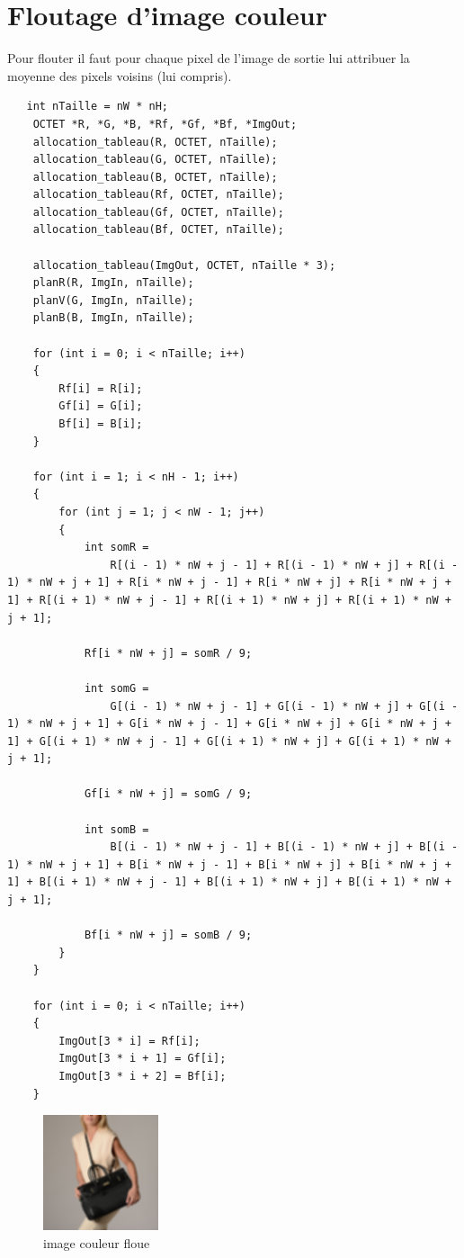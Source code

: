 \documentclass{article}
\begin{document}
\section{Floutage d'image couleur}
Pour flouter il faut pour chaque pixel de l'image de sortie lui attribuer la moyenne des pixels voisins (lui compris).
\begin{lstlisting}
   int nTaille = nW * nH;
    OCTET *R, *G, *B, *Rf, *Gf, *Bf, *ImgOut;
    allocation_tableau(R, OCTET, nTaille);
    allocation_tableau(G, OCTET, nTaille);
    allocation_tableau(B, OCTET, nTaille);
    allocation_tableau(Rf, OCTET, nTaille);
    allocation_tableau(Gf, OCTET, nTaille);
    allocation_tableau(Bf, OCTET, nTaille);

    allocation_tableau(ImgOut, OCTET, nTaille * 3);
    planR(R, ImgIn, nTaille);
    planV(G, ImgIn, nTaille);
    planB(B, ImgIn, nTaille);

    for (int i = 0; i < nTaille; i++)
    {
        Rf[i] = R[i];
        Gf[i] = G[i];
        Bf[i] = B[i];
    }

    for (int i = 1; i < nH - 1; i++)
    {
        for (int j = 1; j < nW - 1; j++)
        {
            int somR =
                R[(i - 1) * nW + j - 1] + R[(i - 1) * nW + j] + R[(i - 1) * nW + j + 1] + R[i * nW + j - 1] + R[i * nW + j] + R[i * nW + j + 1] + R[(i + 1) * nW + j - 1] + R[(i + 1) * nW + j] + R[(i + 1) * nW + j + 1];

            Rf[i * nW + j] = somR / 9;

            int somG =
                G[(i - 1) * nW + j - 1] + G[(i - 1) * nW + j] + G[(i - 1) * nW + j + 1] + G[i * nW + j - 1] + G[i * nW + j] + G[i * nW + j + 1] + G[(i + 1) * nW + j - 1] + G[(i + 1) * nW + j] + G[(i + 1) * nW + j + 1];

            Gf[i * nW + j] = somG / 9;

            int somB =
                B[(i - 1) * nW + j - 1] + B[(i - 1) * nW + j] + B[(i - 1) * nW + j + 1] + B[i * nW + j - 1] + B[i * nW + j] + B[i * nW + j + 1] + B[(i + 1) * nW + j - 1] + B[(i + 1) * nW + j] + B[(i + 1) * nW + j + 1];

            Bf[i * nW + j] = somB / 9;
        }
    }

    for (int i = 0; i < nTaille; i++)
    {
        ImgOut[3 * i] = Rf[i];
        ImgOut[3 * i + 1] = Gf[i];
        ImgOut[3 * i + 2] = Bf[i];
    }

\end{lstlisting}
\begin{figure}[h!]
\centerline{\includegraphics[scale=1.2]{./rendus/coulFlou.png}}
\caption{image couleur floue }
\end{figure}
\end{document}
